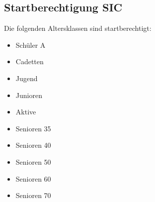 \subsection{Startberechtigung SIC}
Die folgenden Altersklassen sind startberechtigt:
\begin{itemize}
	\item Schüler A
	\item Cadetten
	\item Jugend
	\item Junioren
	\item Aktive
	\item Senioren 35
	\item Senioren 40
	\item Senioren 50
	\item Senioren 60
	\item Senioren 70
\end{itemize}